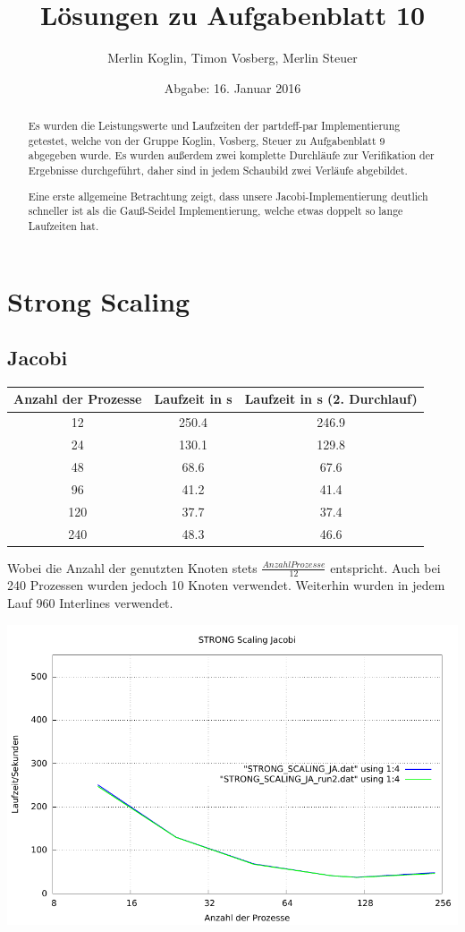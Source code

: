 \documentclass[a4paper]{article}
\author{Merlin Koglin, Timon Vosberg, Merlin Steuer}
\date{Abgabe: 16. Januar 2016}
\title{Lösungen zu Aufgabenblatt 10}
\begin{document}
\maketitle
\tableofcontents

\begin{abstract}
Es wurden die Leistungswerte und Laufzeiten der partdeff-par Implementierung getestet, welche von der Gruppe Koglin, Vosberg, Steuer zu Aufgabenblatt 9 abgegeben wurde. Es wurden außerdem zwei komplette Durchläufe zur Verifikation der Ergebnisse durchgeführt, daher sind in jedem Schaubild zwei Verläufe abgebildet.

Eine erste allgemeine Betrachtung zeigt, dass unsere Jacobi-Implementierung deutlich schneller ist als die Gauß-Seidel Implementierung, welche etwas doppelt so lange Laufzeiten hat. 
\end{abstract}

\newpage

\section{Strong Scaling}
\subsection{Jacobi}
\begin{tabular}{|c|c|c|}
\hline 
Anzahl der Prozesse & Laufzeit in s & Laufzeit in s (2. Durchlauf) \\ 
\hline 
12 & 250.4 & 246.9 \\ 
\hline 
24 & 130.1 & 129.8 \\ 
\hline 
48 & 68.6 & 67.6 \\ 
\hline 
96 & 41.2 & 41.4 \\ 
\hline 
120 & 37.7 & 37.4 \\ 
\hline 
240 & 48.3 & 46.6 \\ 
\hline
\end{tabular} 

Wobei die Anzahl der genutzten Knoten stets $\frac{Anzahl Prozesse}{12}$ entspricht. Auch bei 240 Prozessen wurden jedoch 10 Knoten verwendet. Weiterhin wurden in jedem Lauf 960 Interlines verwendet.

\includegraphics[scale=0.8]{img/STRONG_SCALING_JA_laufzeit.pdf}
\end{document}
